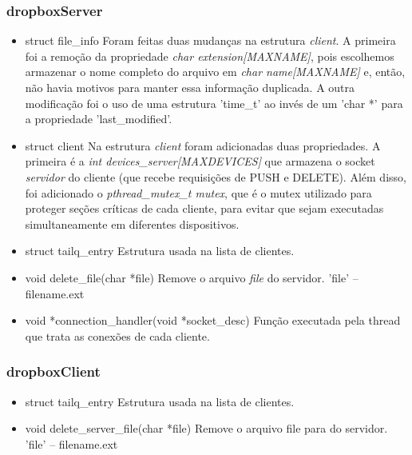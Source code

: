 \documentclass[a4paper]{article}
\begin{document}
\subsubsection{dropboxServer}
\begin{itemize}
	\item struct file\_info
	\newline Foram feitas duas mudanças na estrutura \textit{client}. A primeira foi a remoção da propriedade \textit{char extension[MAXNAME]}, pois escolhemos armazenar o nome completo do arquivo em \textit{char name[MAXNAME]} e, então, não havia motivos para manter essa informação duplicada. A outra modificação foi o uso de uma estrutura 'time\_t' ao invés de um 'char *' para a propriedade 'last\_modified'.
	
	\item struct client
	\newline Na estrutura \textit{client} foram adicionadas duas propriedades. A primeira é a \textit{int devices\_server[MAXDEVICES]} que armazena o socket \textit{servidor} do cliente (que recebe requisições de PUSH e DELETE). Além disso, foi adicionado o \textit{pthread\_mutex\_t mutex}, que é o mutex utilizado para proteger seções críticas de cada cliente, para evitar que sejam executadas simultaneamente em diferentes dispositivos.
	
	\item struct tailq\_entry
	\newline Estrutura usada na lista de clientes.
	
	\item void delete\_file(char *file)
	\newline Remove o arquivo \textit{file} do servidor. 'file' – filename.ext
	
	\item void *connection\_handler(void *socket\_desc)
	\newline Função executada pela thread que trata as conexões de cada cliente.

\end{itemize}


\subsubsection{dropboxClient}
\begin{itemize}
	\item struct tailq\_entry
	\newline Estrutura usada na lista de clientes.
	
	\item void delete\_server\_file(char *file)
	\newline Remove o arquivo file para do servidor. 'file' – filename.ext
\end{itemize}
\end{document}
